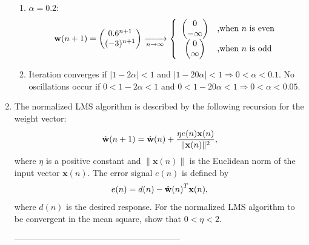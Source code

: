 \documentclass[10pt]{article}
\newcommand{\vw}{{\bf{w}}}
\begin{document}
\begin{enumerate}
\begin{enumerate}
\item $\alpha = 0.2$: 
\begin{equation*}
  \vw(n+1) = \begin{pmatrix} 0.6^{n+1} \\
    (-3)^{n+1} \end{pmatrix} \xrightarrow[n\rightarrow\infty]{}\left\{\begin{array}{cl}\begin{pmatrix}0\\-\infty\end{pmatrix} & \mbox{,when } n\mbox{ is even}\\
\begin{pmatrix}0\\\infty\end{pmatrix} & \mbox{,when } n\mbox{ is odd}\end{array}\right.
\end{equation*}

\item Iteration converges if $| 1 - 2 \alpha | < 1$ and $| 1 - 20 \alpha | < 1 \Rightarrow 0 < \alpha < 0.1$. 
No oscillations occur if $0 < 1 - 2 \alpha < 1$ and $0 < 1 - 20 \alpha < 1 \Rightarrow 0 < \alpha < 0.05$.

\end{enumerate}

\vspace{12mm}

\item The normalized LMS algorithm is described by the following
recursion for the weight vector:
\begin{equation*}
\Hat{\mathbf{w}}(n+1)= \Hat{\mathbf{w}}(n) +\frac{\eta e(n)
\mathbf{x}(n)} {\| \mathbf{x}(n) \|^2},
\end{equation*}
where $\eta$ is a positive constant and $\|\mathbf{x}(n) \|$ is the
Euclidean norm of the input vector $\mathbf{x}(n)$. The error
signal $e(n)$ is defined by
\begin{equation*}
e(n)=d(n)-{\Hat{\mathbf{w}}(n)}^T \mathbf{x}(n),
\end{equation*}
where $d(n)$ is the desired response. For the normalized LMS algorithm to
be convergent in the mean square, show that $0< \eta <2$.

-----------------------------------------------------------



\end{enumerate}
\end{document}
